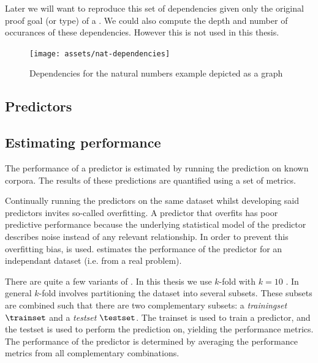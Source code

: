 Later we will want to reproduce this set of dependencies given only the original proof goal (or type) of a \coqobj.
We could also compute the depth and number of occurances of these dependencies.
However this is not used in this thesis.

\begin{figure}[H]
	\centering
	\texttt{[image: assets/nat-dependencies]}
	\caption{Dependencies for the natural numbers example depicted as a graph}
\end{figure}

\subsection{Predictors}
\label{section:predictors}


\subsection{Estimating performance}
\label{section:estimating-performance}
The performance of a predictor is estimated by running the prediction on known corpora.
The results of these predictions are quantified using a set of metrics.

Continually running the predictors on the same dataset whilst developing said predictors invites so-called overfitting.
A predictor that overfits has poor predictive performance because the underlying statistical model of the predictor describes noise instead of any relevant relationship.
In order to prevent this overfitting bias, \crossvalidation is used.
\crossvalidation estimates the performance of the predictor for an independant dataset (i.e. from a real problem).

There are quite a few variants of \crossvalidation.
In this thesis we use $k$-fold \crossvalidation with $k = 10$ \cite{kohavi1995study}.
In general $k$-fold \crossvalidation involves partitioning the dataset into several subsets.
These subsets are combined such that there are two complementary subsets: a \emph{trainingset} $\trainset$ and a \emph{testset} $\testset$.
The trainset is used to train a predictor, and the testset is used to perform the prediction on, yielding the performance metrics.
The performance of the predictor is determined by averaging the performance metrics from all complementary combinations.


